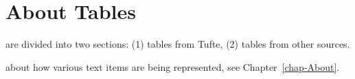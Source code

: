 \chapter{About Tables}
\label{chap-Tables}
 are divided into two sections: 
(1) tables from Tufte,
(2) tables from other sources.

 about how various text items are being represented,
see Chapter~\ref{chap-About}.


